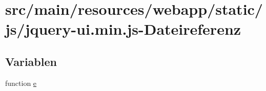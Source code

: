 \hypertarget{jquery-ui_8min_8js}{\section{src/main/resources/webapp/static/js/jquery-\/ui.min.\+js-\/\+Dateireferenz}
\label{jquery-ui_8min_8js}
}
\subsection*{Variablen}
\begin{DoxyCompactItemize}
\item 
function \hyperlink{jquery-ui_8min_8js_a2c038346d47955cbe2cb91e338edd7e1}{e}
\end{DoxyCompactItemize}


